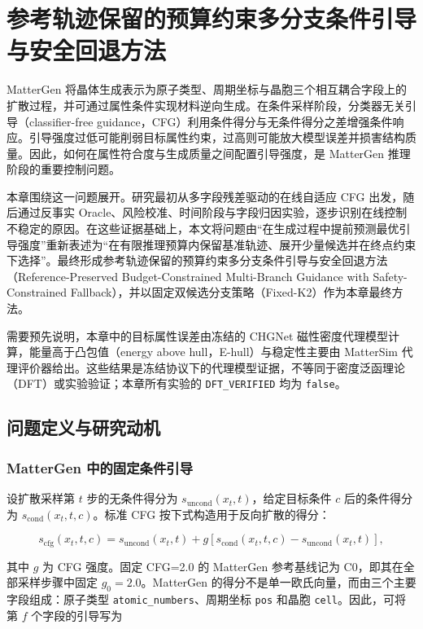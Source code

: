 \chapter{参考轨迹保留的预算约束多分支条件引导与安全回退方法}

MatterGen 将晶体生成表示为原子类型、周期坐标与晶胞三个相互耦合字段上的扩散过程，并可通过属性条件实现材料逆向生成\citep{zeni2025}。在条件采样阶段，分类器无关引导（classifier-free guidance，CFG）利用条件得分与无条件得分之差增强条件响应\citep{ho2022}。引导强度过低可能削弱目标属性约束，过高则可能放大模型误差并损害结构质量。因此，如何在属性符合度与生成质量之间配置引导强度，是 MatterGen 推理阶段的重要控制问题。

本章围绕这一问题展开。研究最初从多字段残差驱动的在线自适应 CFG 出发，随后通过反事实 Oracle、风险校准、时间阶段与字段归因实验，逐步识别在线控制不稳定的原因。在这些证据基础上，本文将问题由``在生成过程中提前预测最优引导强度''重新表述为``在有限推理预算内保留基准轨迹、展开少量候选并在终点约束下选择''。最终形成参考轨迹保留的预算约束多分支条件引导与安全回退方法（Reference-Preserved Budget-Constrained Multi-Branch Guidance with Safety-Constrained Fallback），并以固定双候选分支策略（Fixed-K2）作为本章最终方法。

需要预先说明，本章中的目标属性误差由冻结的 CHGNet 磁性密度代理模型计算\citep{deng2023}，能量高于凸包值（energy above hull，E-hull）与稳定性主要由 Matter\allowbreak Sim 代理评价器给出\citep{yang2024mattersim}。这些结果是冻结协议下的代理模型证据，不等同于密度泛函理论（DFT）或实验验证；本章所有实验的 \texttt{DFT\_VERIFIED} 均为 \texttt{false}。

\section{问题定义与研究动机}

\subsection{MatterGen 中的固定条件引导}

设扩散采样第 \(t\) 步的无条件得分为 \(s_{\mathrm{uncond}}(x_t,t)\)，给定目标条件 \(c\) 后的条件得分为 \(s_{\mathrm{cond}}(x_t,t,c)\)。标准 CFG 按下式构造用于反向扩散的得分：

\[
s_{\mathrm{cfg}}(x_t,t,c)
=s_{\mathrm{uncond}}(x_t,t)
+g\left[s_{\mathrm{cond}}(x_t,t,c)-s_{\mathrm{uncond}}(x_t,t)\right],
\]

其中 \(g\) 为 CFG 强度。固定 CFG=2.0 的 MatterGen 参考基线记为 C0，即其在全部采样步骤中固定 \(g_0=2.0\)。MatterGen 的得分不是单一欧氏向量，而由三个主要字段组成：原子类型 \texttt{atomic\_numbers}、周期坐标 \texttt{pos} 和晶胞 \texttt{cell}。因此，可将第 \(f\) 个字段的引导写为

